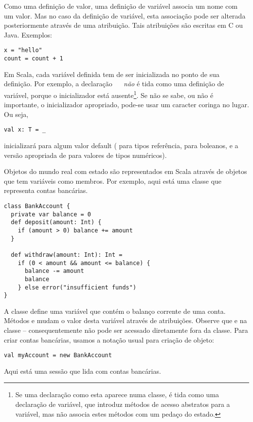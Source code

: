 Como uma definição de valor, uma definição de variável associa um nome com um valor. Mas no caso da definição 
de variável, esta associação pode ser alterada posteriormente através de uma atribuição. Tais atribuições são 
escritas em C ou Java. Exemplos: 
\begin{lstlisting}
x = "hello"
count = count + 1
\end{lstlisting}
Em Scala, cada variável definida tem de ser inicializada no ponto de sua definição. Por exemplo, a declaração 
~~ {\em não} é tida como uma definição de variável, porque o inicializador está 
ausente\footnote{Se uma declaração como esta aparece numa classe, é tida como uma declaração de variável, que 
introduz métodos de acesso abstratos para a variável, mas não associa estes métodos com um pedaço do estado.}.
Se não se sabe, ou não é importante, o inicializador apropriado, pode-se usar um caracter coringa no lugar. 
Ou seja,
\begin{lstlisting}
val x: T = _
\end{lstlisting}
inicializará  para algum valor default ( para tipos referência,  para boleanos, e
a versão apropriada de  para valores de tipos numéricos).

Objetos do mundo real com estado são representados em Scala através de objetos que tem variáveis como membros.
Por exemplo, aqui está uma classe que representa contas bancárias.
\begin{lstlisting}
class BankAccount {
  private var balance = 0
  def deposit(amount: Int) {
    if (amount > 0) balance += amount
  }

  def withdraw(amount: Int): Int =
    if (0 < amount && amount <= balance) {
      balance -= amount
      balance
    } else error("insufficient funds")
}
\end{lstlisting}


A classe define uma variável  que contém o balanço corrente de uma conta. Métodos  e
 mudam o valor desta variável através de atribuições. Observe que  e 
na classe  -- consequentemente não pode ser acessado diretamente fora da classe.
Para criar contas bancárias, usamos a notação usual para criação de objeto:
\begin{lstlisting}
val myAccount = new BankAccount
\end{lstlisting}

\example Aqui está uma sessão  que lida com contas bancárias.

